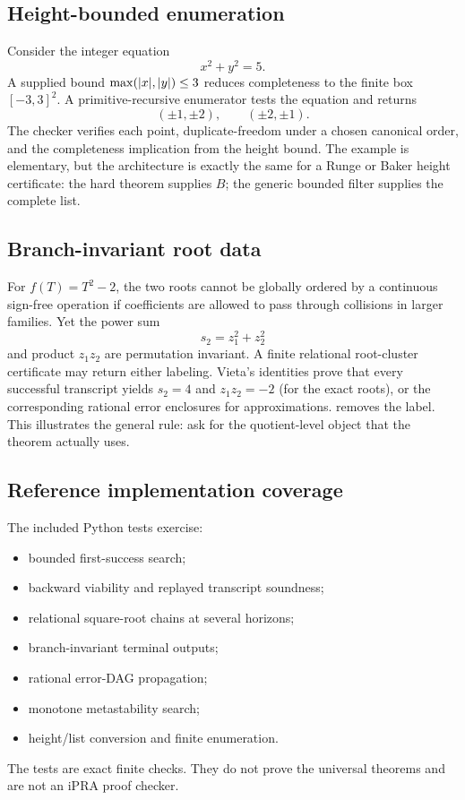 \subsection{Height-bounded enumeration}

Consider the integer equation
\[
 x^2+y^2=5.
\]
A supplied bound $\max(\lvert x\rvert,\lvert y\rvert)\le3$ reduces completeness to the finite box $[-3,3]^2$.  A primitive-recursive enumerator tests the equation and returns
\[
 (\pm1,\pm2),\qquad(\pm2,\pm1).
\]
The checker verifies each point, duplicate-freedom under a chosen canonical order, and the completeness implication from the height bound.  The example is elementary, but the architecture is exactly the same for a Runge or Baker height certificate: the hard theorem supplies $B$; the generic bounded filter supplies the complete list.

\subsection{Branch-invariant root data}

For $f(T)=T^2-2$, the two roots cannot be globally ordered by a continuous sign-free operation if coefficients are allowed to pass through collisions in larger families.  Yet the power sum
\[
 s_2=z_1^2+z_2^2
\]
and product $z_1z_2$ are permutation invariant.  A finite relational root-cluster certificate may return either labeling.  Vieta's identities prove that every successful transcript yields $s_2=4$ and $z_1z_2=-2$ (for the exact roots), or the corresponding rational error enclosures for approximations.   removes the label.  This illustrates the general rule: ask for the quotient-level object that the theorem actually uses.

\subsection{Reference implementation coverage}

The included Python tests exercise:
\begin{itemize}
\item bounded first-success search;
\item backward viability and replayed transcript soundness;
\item relational square-root chains at several horizons;
\item branch-invariant terminal outputs;
\item rational error-DAG propagation;
\item monotone metastability search;
\item height/list conversion and finite enumeration.
\end{itemize}
The tests are exact finite checks.  They do not prove the universal theorems and are not an iPRA proof checker.
